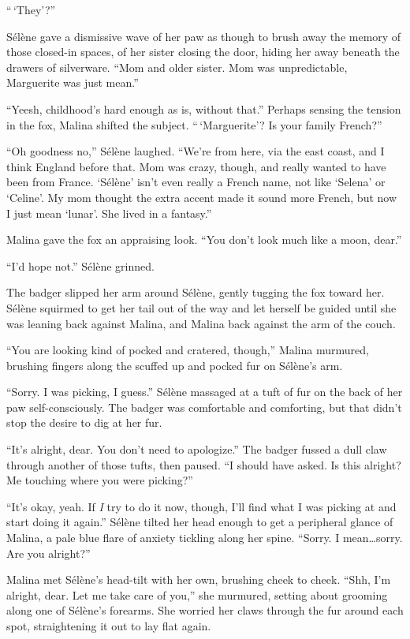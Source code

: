 ``\,`They'?''

Sélène gave a dismissive wave of her paw as though to brush away the memory of those closed-in spaces, of her sister closing the door, hiding her away beneath the drawers of silverware.  ``Mom and older sister. Mom was unpredictable, Marguerite was just mean.''

``Yeesh, childhood's hard enough as is, without that.'' Perhaps sensing the tension in the fox, Malina shifted the subject. ``\,`Marguerite'? Is your family French?''

``Oh goodness no,'' Sélène laughed. ``We're from here, via the east coast, and I think England before that. Mom was crazy, though, and really wanted to have been from France. `Sélène' isn't even really a French name, not like `Selena' or `Celine'. My mom thought the extra accent made it sound more French, but now I just mean `lunar'. She lived in a fantasy.''

Malina gave the fox an appraising look. ``You don't look much like a moon, dear.''

``I'd hope not.'' Sélène grinned.

The badger slipped her arm around Sélène, gently tugging the fox toward her. Sélène squirmed to get her tail out of the way and let herself be guided until she was leaning back against Malina, and Malina back against the arm of the couch.

``You are looking kind of pocked and cratered, though,'' Malina murmured, brushing fingers along the scuffed up and pocked fur on Sélène's arm.

``Sorry. I was picking, I guess.'' Sélène massaged at a tuft of fur on the back of her paw self-consciously. The badger was comfortable and comforting, but that didn't stop the desire to dig at her fur.

``It's alright, dear. You don't need to apologize.'' The badger fussed a dull claw through another of those tufts, then paused. ``I should have asked. Is this alright? Me touching where you were picking?''

``It's okay, yeah. If \emph{I} try to do it now, though, I'll find what I was picking at and start doing it again.'' Sélène tilted her head enough to get a peripheral glance of Malina, a pale blue flare of anxiety tickling along her spine. ``Sorry. I mean\ldots{}sorry. Are you alright?''

Malina met Sélène's head-tilt with her own, brushing cheek to cheek. ``Shh, I'm alright, dear. Let me take care of you,'' she murmured, setting about grooming along one of Sélène's forearms. She worried her claws through the fur around each spot, straightening it out to lay flat again.

